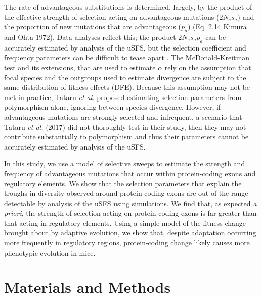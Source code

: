\documentclass[11pt]{article}
\begin{document}
The rate of advantageous substitutions is determined, largely, by the product of the effective strength of selection acting on advantageous mutations ($2N_es_a$) and the proportion of new mutations that are advantageous ($p_a$) (Eq. 2.14 Kimura and Ohta 1972). Data analyses reflect this; the product $2N_es_ap_a$ can be accurately estimated by analysis of the uSFS, but the selection coefficient and frequency parameters can be difficult to tease apart \citep{RN210,RN354}. The McDonald-Kreitman test \citep{RN293} and its extensions, that are used to estimate $\alpha$ rely on the assumption that focal species and the outgroups used to estimate divergence are subject to the same distribution of fitness effects (DFE). Because this assumption may not be met in practice, Tataru \textit{et al.} proposed estimating selection parameters from polymorphism alone, ignoring between-species divergence. However, if advantageous mutations are strongly selected and infrequent, a scenario that Tataru \textit{et al.} (2017) did not thoroughly test in their study, then they may not contribute substantially to polymorphism and thus their parameters cannot be accurately estimated by analysis of the uSFS.

In this study, we use a model of selective sweeps to estimate the strength and frequency of advantageous mutations that occur within protein-coding exons and regulatory elements. We show that the selection parameters that explain the troughs in diversity observed around protein-coding exons are out of the range detectable by analysis of the uSFS using simulations.  We find that, as expected \textit{a priori}, the strength of selection acting on protein-coding exons is far greater than that acting in regulatory elements. Using a simple model of the fitness change brought about by adaptive evolution, we show that, despite adaptation occurring more frequently in regulatory regions, protein-coding change likely causes more phenotypic evolution in mice.

%
%
\section*{Materials and Methods}
\end{document}
